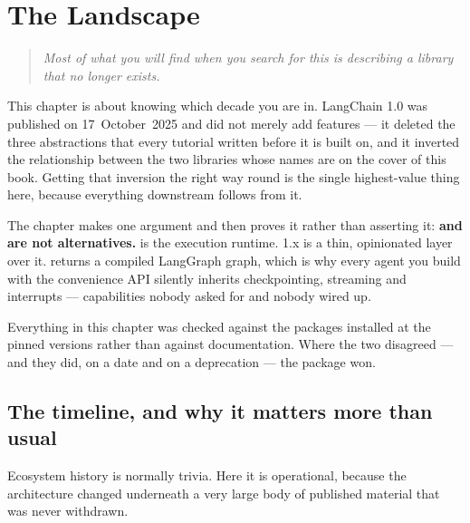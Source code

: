 \chapter{The Landscape}
\label{ch:landscape}

\begin{quote}\itshape
Most of what you will find when you search for this is describing a library that
no longer exists.
\end{quote}

\noindent
This chapter is about knowing which decade you are in. LangChain 1.0 was
published on 17~October~2025 and did not merely add features --- it deleted the
three abstractions that every tutorial written before it is built on, and it
inverted the relationship between the two libraries whose names are on the cover
of this book. Getting that inversion the right way round is the single
highest-value thing here, because everything downstream follows from it.

The chapter makes one argument and then proves it rather than asserting it:
\textbf{ and  are not alternatives.}
 is the execution runtime.  1.x is a thin,
opinionated layer over it.  returns a compiled LangGraph
graph, which is why every agent you build with the convenience API silently
inherits checkpointing, streaming and interrupts --- capabilities nobody asked
for and nobody wired up.

Everything in this chapter was checked against the packages installed at the
pinned versions rather than against documentation. Where the two disagreed ---
and they did, on a date and on a deprecation --- the package won.

\section{The timeline, and why it matters more than usual}
\label{sec:timeline}

Ecosystem history is normally trivia. Here it is operational, because the
architecture changed underneath a very large body of published material that was
never withdrawn.


